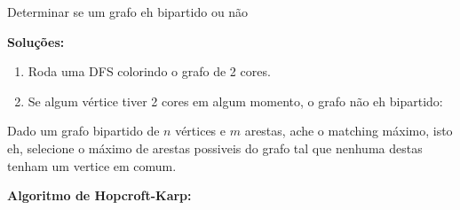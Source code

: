
 Determinar se um grafo eh bipartido ou não

\textbf{Soluções:}
\begin{enumerate}
    \item Roda uma DFS colorindo o grafo de 2 cores.
    \item Se algum vértice tiver 2 cores em algum momento, o grafo não eh bipartido:
\end{enumerate}

 Dado um grafo bipartido de $n$ vértices e $m$ arestas, ache o matching máximo, isto eh, selecione o
 máximo de arestas possiveis do grafo tal que nenhuma destas tenham um vertice em comum.


\textbf{Algoritmo de Hopcroft-Karp:}


\begin{lstlisting}[language=C++, breaklines=true]

\end{lstlisting}

